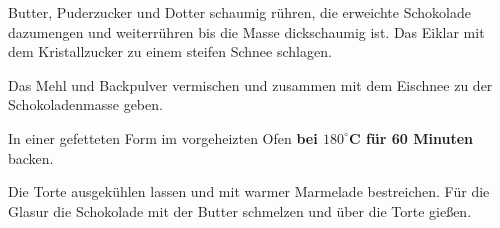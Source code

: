 \vspace*{\fill}
\begin{multicols}{2}

Butter, Puderzucker und Dotter schaumig rühren, die erweichte Schokolade dazumengen und
weiterrühren bis die Masse dickschaumig ist.\newline
Das Eiklar mit dem Kristallzucker zu einem steifen Schnee schlagen.\newline

Das Mehl und Backpulver vermischen und zusammen mit dem Eischnee zu der Schokoladenmasse geben.\newline
 
 In einer gefetteten Form im vorgeheizten Ofen \textbf{ bei $180^\circ$C  für 60 Minuten} backen.\newline
 
Die Torte ausgekühlen lassen und mit warmer Marmelade bestreichen. 
Für die Glasur die Schokolade mit der Butter schmelzen und über die Torte gießen.


\end{multicols}
\vfill
